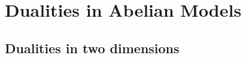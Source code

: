 \chapter{Dualities in Abelian Models}
\label{chap:dualities_in_abelian_models}









\section{Dualities in two dimensions}
\label{sec:dualities_in_two_dimensions}






